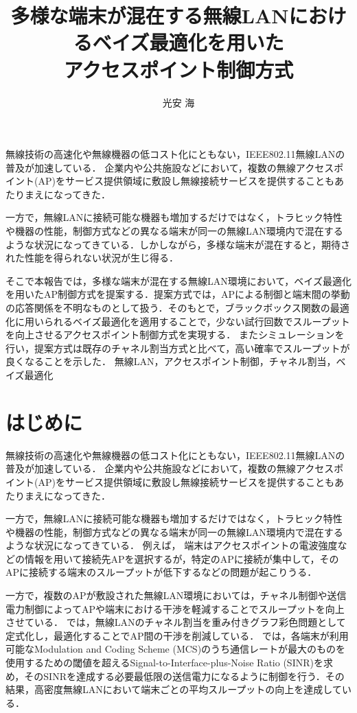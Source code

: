 \documentclass[a4paper,11pt]{jarticle}
\title{多様な端末が混在する無線LANにおけるベイズ最適化を用いた\\アクセスポイント制御方式}
\author{光安 海}
\begin{document}
\titlepage    %
\abstract     %
無線技術の高速化や無線機器の低コスト化にともない，IEEE802.11無線LANの普及が加速している．
企業内や公共施設などにおいて，複数の無線アクセスポイント(AP)をサービス提供領域に敷設し無線接続サービスを提供することもあたりまえになってきた．

一方で，無線LANに接続可能な機器も増加するだけではなく，トラヒック特性や機器の性能，制御方式などの異なる端末が同一の無線LAN環境内で混在するような状況になってきている．しかしながら，多様な端末が混在すると，期待された性能を得られない状況が生じ得る．

そこで本報告では，多様な端末が混在する無線LAN環境において，ベイズ最適化を用いたAP制御方式を提案する．提案方式では，APによる制御と端末間の挙動の応答関係を不明なものとして扱う．そのもとで，ブラックボックス関数の最適化に用いられるベイズ最適化を適用することで，少ない試行回数でスループットを向上させるアクセスポイント制御方式を実現する．
またシミュレーションを行い，提案方式は既存のチャネル割当方式と比べて，高い確率でスループットが良くなることを示した．
\keyword
無線LAN，アクセスポイント制御，チャネル割当，ベイズ最適化
\tableofcontents    %
%
%
\section{はじめに}
無線技術の高速化や無線機器の低コスト化にともない，IEEE802.11無線LAN\cite{ieee802.11}の普及が加速している．
企業内や公共施設などにおいて，複数の無線アクセスポイント(AP)をサービス提供領域に敷設し無線接続サービスを提供することもあたりまえになってきた．

一方で，無線LANに接続可能な機器も増加するだけではなく，トラヒック特性や機器の性能，制御方式などの異なる端末が同一の無線LAN環境内で混在するような状況になってきている．
例えば，
端末はアクセスポイントの電波強度などの情報を用いて接続先APを選択するが，特定のAPに接続が集中して，そのAPに接続する端末のスループットが低下するなどの問題が起こりうる．

一方で，複数のAPが敷設された無線LAN環境においては，チャネル制御\cite{channel_assign}や送信電力制御\cite{Chaves2014}によってAPや端末における干渉を軽減することでスループットを向上させている．
\cite{channel_assign}では，無線LANのチャネル割当を重み付きグラフ彩色問題として定式化し，最適化することでAP間の干渉を削減している．
\cite{Chaves2014}では，各端末が利用可能なModulation and Coding Scheme (MCS)のうち通信レートが最大のものを使用するための閾値を超えるSignal-to-Interface-plus-Noise Ratio (SINR)を求め，そのSINRを達成する必要最低限の送信電力になるように制御を行う．その結果，高密度無線LANにおいて端末ごとの平均スループットの向上を達成している．
\end{document}
